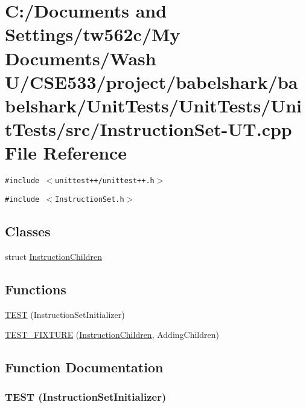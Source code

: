 \hypertarget{_instruction_set-_u_t_8cpp}{
\section{C:/Documents and Settings/tw562c/My Documents/Wash U/CSE533/project/babelshark/babelshark/UnitTests/UnitTests/UnitTests/src/InstructionSet-UT.cpp File Reference}
\label{_instruction_set-_u_t_8cpp}
}
{\tt \#include $<$unittest++/unittest++.h$>$}\par
{\tt \#include $<$InstructionSet.h$>$}\par
\subsection*{Classes}
\begin{CompactItemize}
\item 
struct \hyperlink{struct_instruction_children}{InstructionChildren}
\end{CompactItemize}
\subsection*{Functions}
\begin{CompactItemize}
\item 
\hyperlink{_instruction_set-_u_t_8cpp_6de6646d3331bdaf8e6fde21986dbf36}{TEST} (InstructionSetInitializer)
\item 
\hyperlink{_instruction_set-_u_t_8cpp_32b547a07f87bdb329c9ec3769d3f023}{TEST\_\-FIXTURE} (\hyperlink{struct_instruction_children}{InstructionChildren}, AddingChildren)
\end{CompactItemize}


\subsection{Function Documentation}
\hypertarget{_instruction_set-_u_t_8cpp_6de6646d3331bdaf8e6fde21986dbf36}{
\subsubsection[{TEST}]{\setlength{\rightskip}{0pt plus 5cm}TEST (InstructionSetInitializer)}}
\label{_instruction_set-_u_t_8cpp_6de6646d3331bdaf8e6fde21986dbf36}


